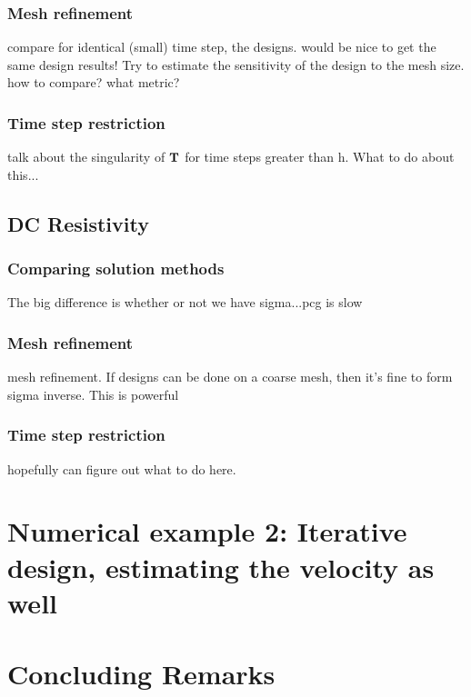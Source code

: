 \documentclass[12pt]{article}
\newcommand{\bT}  {\text{\bf T}} %
\begin{document}
\subsubsection{Mesh refinement}
compare for identical (small) time step, the designs. would be nice to get the same design results! Try to estimate the sensitivity of the design to the mesh size. how to compare? what metric?


\subsubsection{Time step restriction}
talk about the singularity of $\bT$ for time steps greater than h. What to do about this...

\subsection{DC Resistivity}



\subsubsection{Comparing solution methods} %
The big difference is whether or not we have sigma...pcg is slow

\subsubsection{Mesh refinement}
mesh refinement. If designs can be done on a coarse mesh, then it's fine to form sigma inverse. This is powerful

\subsubsection{Time step restriction}
hopefully can figure out what to do here.




\section{Numerical example 2: Iterative design, estimating the velocity as well} 



\section{Concluding Remarks}








\end{document}
